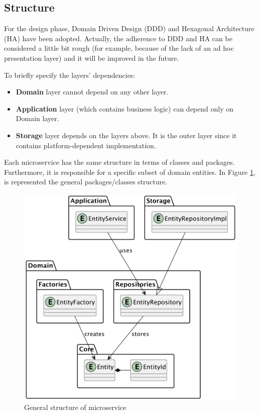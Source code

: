 \documentclass{scrartcl}
\begin{document}
    \subsection{Structure}

%

    For the design phase, Domain Driven Design (DDD) and Hexagonal Architecture (HA) have been adopted.
    Actually, the adherence to DDD and HA can be considered a little bit rough (for example, because of the lack of an ad hoc presentation layer) and it will be improved in the future.

    To briefly specify the layers' dependencies:
    \begin{itemize}
        \item \textbf{Domain} layer cannot depend on any other layer.
        \item \textbf{Application} layer (which contains business logic) can depend only on Domain layer.
        \item \textbf{Storage} layer depends on the layers above.
        It is the outer layer since it contains platform-dependent implementation.
    \end{itemize}


    Each microservice has the same structure in terms of classes and packages.
    Furthermore, it is responsible for a specific subset of domain entities.
    In Figure \ref{fig:general-structure}, is represented the general packages/classes structure.

    \begin{figure}
        \centering
        \includegraphics[scale=0.55]{img/general-structure}
        \caption{General structure of microservice}
        \label{fig:general-structure}
    \end{figure}
\end{document}
